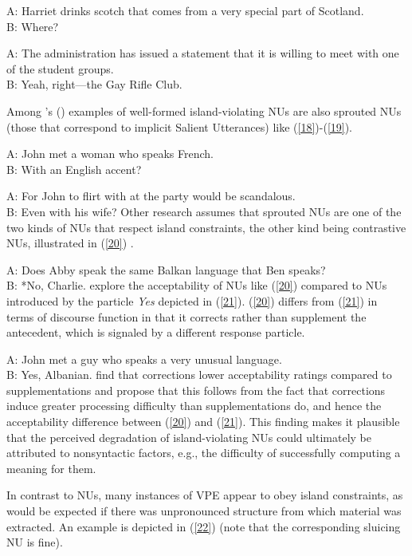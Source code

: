 \documentclass[output=paper
                ,modfonts
                ,nonflat
	        ,collection
	        ,collectionchapter
	        ,collectiontoclongg
 	        ,biblatex
                ,babelshorthands
                ,newtxmath
                ,draftmode
                ,colorlinks, citecolor=brown
]{./langsci/langscibook}
\begin{document}
{\ea A: Harriet drinks scotch that comes from a very special part of Scotland.\\B: Where? \citep[245]{Culicover2005} \label{16}\z

\ea A: The administration has issued a statement that it is willing to meet with one of the student groups.\\B: Yeah, right---the Gay Rifle Club. \citep[245]{Culicover2005} \label{17}\z

Among \citeauthor{Culicover2005}'s (\citeyear[245]{Culicover2005}) examples of well-formed island-violating NUs are also sprouted NUs (those that correspond to implicit Salient Utterances) like (\ref{18})-(\ref{19}).

\ea A: John met a woman who speaks French.\\B: With an English accent?\label{18}\z

\ea A: For John to flirt with at the party would be scandalous. \\B: Even with his wife?\label{19}\z
Other research assumes that sprouted NUs are one of the two kinds of NUs that respect island constraints, the other kind being contrastive NUs, illustrated in (\ref{20}) \citep{Chung1995, Merchant2001, Griffiths2014}.

\ea A: Does Abby speak the same Balkan language that Ben speaks?\\
B: *No, Charlie. \citep{Merchant2001}  \label{20}\z
%
\citet{Schmeh2015} explore the acceptability of NUs like (\ref{20}) compared to NUs introduced by the particle {\it Yes} depicted in (\ref{21}). (\ref{20}) differs from (\ref{21}) in terms of discourse function in that it corrects rather than supplement the antecedent, which is signaled by a different response particle.

\ea A: John met a guy who speaks a very unusual language. \\B: Yes, Albanian. \citep[245]{Culicover2005} \label{21}\z
%
\citet{Schmeh2015} find that corrections lower acceptability ratings compared to supplementations and propose that this follows from the fact that corrections induce greater processing difficulty than supplementations do, and hence the acceptability difference between (\ref{20}) and (\ref{21}). This finding makes it plausible that the perceived degradation of island-violating NUs could ultimately be attributed to nonsyntactic factors, e.g., the difficulty of successfully computing a meaning for them.

In contrast to NUs, many instances of VPE appear to obey island constraints, as would be expected if there was unpronounced structure from which material was extracted. An example is depicted in (\ref{22}) (note that the corresponding sluicing NU is fine).

}
\end{document}
